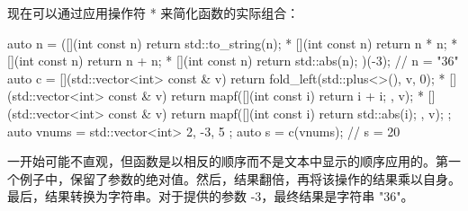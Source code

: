 现在可以通过应用操作符 * 来简化函数的实际组合：

\begin{cpp}
auto n =
    ([](int const n) {return std::to_string(n); } *
    [](int const n) {return n * n; } *
    [](int const n) {return n + n; } *
    [](int const n) {return std::abs(n); })(-3); // n = "36"
auto c =
    [](std::vector<int> const & v) {
        return fold_left(std::plus<>(), v, 0); } *
    [](std::vector<int> const & v) {
        return mapf([](int const i) {return i + i; }, v); } *
    [](std::vector<int> const & v) {
        return mapf([](int const i) {return std::abs(i); }, v); };
auto vnums = std::vector<int>{ 2, -3, 5 };
auto s = c(vnums); // s = 20
\end{cpp}

一开始可能不直观，但函数是以相反的顺序而不是文本中显示的顺序应用的。第一个例子中，保留了参数的绝对值。然后，结果翻倍，再将该操作的结果乘以自身。最后，结果转换为字符串。对于提供的参数 -3，最终结果是字符串 "36"。

